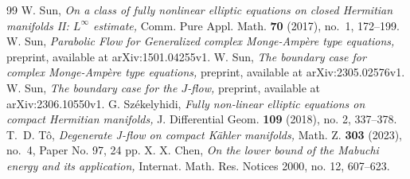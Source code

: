 \documentclass[10pt,a4paper]{amsart}
\numberwithin{equation}{section}
\begin{document}
\begin{thebibliography}{99}
 W. Sun, \textit{On a class of fully nonlinear elliptic equations on closed Hermitian manifolds II: $L^\infty$ estimate,} Comm. Pure Appl. Math. {\bf 70} (2017), no.~1, 172--199.
 W. Sun, \textit{Parabolic Flow for Generalized complex Monge-Ampère type equations,} preprint, available at arXiv:1501.04255v1.
 W. Sun, \textit{The boundary case for complex Monge-Ampère type equations,} preprint, available at arXiv:2305.02576v1.
 W. Sun, \textit{The boundary case for the $J$-flow,} preprint, available at arXiv:2306.10550v1.
 G. Sz{\'e}kelyhidi, \textit{Fully non-linear elliptic equations on compact Hermitian manifolds,} J. Differential Geom. \textbf{109} (2018), no. 2, 337--378.
 T.~D. T\^o, \textit{Degenerate J-flow on compact K\"ahler manifolds,} Math. Z. {\bf 303} (2023), no.~4, Paper No. 97, 24 pp.
 X. X. Chen, \textit{On the lower bound of the Mabuchi energy and its application,} Internat. Math. Res. Notices 2000, no. 12, 607--623.
\end{thebibliography}
\end{document}
